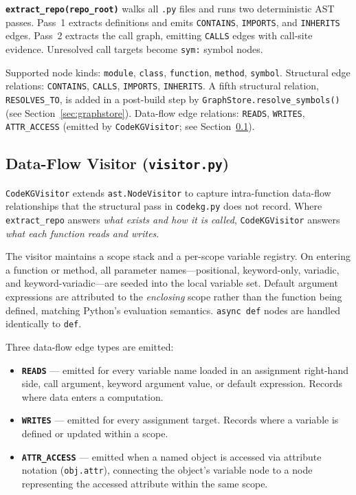 \documentclass[10pt]{article}
\begin{document}
\textbf{\texttt{extract\_repo(repo\_root)}} walks all \texttt{.py} files and runs
two deterministic AST passes. Pass~1 extracts definitions and emits
\texttt{CONTAINS}, \texttt{IMPORTS}, and \texttt{INHERITS} edges. Pass~2 extracts
the call graph, emitting \texttt{CALLS} edges with call-site evidence. Unresolved
call targets become \texttt{sym:} symbol nodes.

Supported node kinds: \texttt{module}, \texttt{class}, \texttt{function},
\texttt{method}, \texttt{symbol}.
Structural edge relations: \texttt{CONTAINS}, \texttt{CALLS}, \texttt{IMPORTS},
\texttt{INHERITS}. A fifth structural relation, \texttt{RESOLVES\_TO}, is added
in a post-build step by \texttt{GraphStore.resolve\_symbols()} (see
Section~\ref{sec:graphstore}).
Data-flow edge relations: \texttt{READS}, \texttt{WRITES}, \texttt{ATTR\_ACCESS}
(emitted by \texttt{CodeKGVisitor}; see Section~\ref{sec:visitor}).

\subsection{Data-Flow Visitor (\texttt{visitor.py})}
\label{sec:visitor}

\texttt{CodeKGVisitor} extends \texttt{ast.NodeVisitor} to capture intra-function
data-flow relationships that the structural pass in \texttt{codekg.py} does not
record. Where \texttt{extract\_repo} answers \emph{what exists and how it is
called}, \texttt{CodeKGVisitor} answers \emph{what each function reads and writes}.

The visitor maintains a scope stack and a per-scope variable registry. On entering
a function or method, all parameter names---positional, keyword-only, variadic, and
keyword-variadic---are seeded into the local variable set. Default argument
expressions are attributed to the \emph{enclosing} scope rather than the function
being defined, matching Python's evaluation semantics. \texttt{async def} nodes are
handled identically to \texttt{def}.

Three data-flow edge types are emitted:

\begin{itemize}
\item \textbf{\texttt{READS}} --- emitted for every variable name loaded in an
assignment right-hand side, call argument, keyword argument value, or default
expression. Records where data enters a computation.
\item \textbf{\texttt{WRITES}} --- emitted for every assignment target. Records
where a variable is defined or updated within a scope.
\item \textbf{\texttt{ATTR\_ACCESS}} --- emitted when a named object is accessed
via attribute notation (\texttt{obj.attr}), connecting the object's variable node
to a node representing the accessed attribute within the same scope.
\end{itemize}
\end{document}
